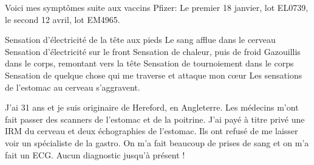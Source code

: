 Voici mes symptômes suite aux vaccins Pfizer: Le premier 18 janvier, lot EL0739,
le second 12 avril, lot EM4965.

Sensation d'électricité de la tête aux pieds Le sang afflue dans le cerveau
Sensation d'électricité sur le front Sensation de chaleur, puis de froid
Gazouillis dans le corps, remontant vers la tête Sensation de tournoiement dans
le corps Sensation de quelque chose qui me traverse et attaque mon cœur Les
sensations de l'estomac au cerveau s'aggravent.

J'ai 31 ans et je suis originaire de Hereford, en Angleterre. Les médecins m'ont
fait passer des scanners de l'estomac et de la poitrine. J'ai payé à titre privé
une IRM du cerveau et deux échographies de l'estomac. Ils ont refusé de me
laisser voir un spécialiste de la gastro. On m'a fait beaucoup de prises de sang
et on m'a fait un ECG. Aucun diagnostic jusqu'à présent !
